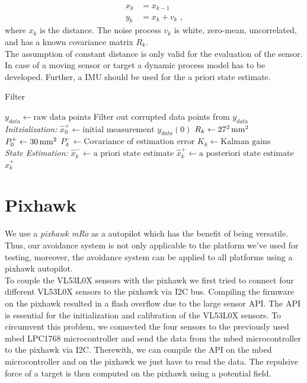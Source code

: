 \begin{equation}
\label{eq:filter}
\begin{split} 
x_k & = x_{k-1} \\
y_k & = x_k + v_k \text{ ,}
\end{split}
\end{equation}
where $x_k$ is the distance. The noise process $v_k$ is white, zero-mean, uncorrelated, and has a known covariance matrix  $R_k$.\\
The assumption of constant distance is only valid for the evaluation of the sensor. In case of a moving sensor or target a dynamic process model has to be developed. Further, a IMU should be used for the a priori state estimate.\\

\begin{algorithm}
	\caption{Filter}\label{alg:filter}
	\begin{algorithmic}[1]
		\State $y_{data}\gets \text{raw data points}$ 
		\State Filter out corrupted data points from $y_{data}$ \\
		\textit{Initzialization:}
		\State $\hat{x}^+_0\gets\text{initial measurement }y_{data}(0)$
		\State $R_k\gets\unit[27^2]{mm^2}$ 
		\State $P^+_0\gets \unit[30]{mm^2}$ 
		\For{ each $k = (0, \text{ number of data point]}$}	
		\State  $P^-_k \gets \text{Covariance of estimation error}$
		\State	$K_k \gets \text{Kalman gains}$
		\EndFor \\
		\textit{State Estimation:}	 
		\For{ each $k = (0, \text{ number of data point]}$}
		\State {} 
		\State $\hat{x}^-_k \gets \text{a priori state estimate}$
		\State $\hat{x}^+_k \gets \text{a posteriori state estimate}$
		\EndFor
		\State \Return $\hat{x}^+_k$
		\EndProcedure
		
	\end{algorithmic}
\end{algorithm}


\section{Pixhawk}
\label{sec:pixhawk}
We use a \textit{pixhawk mRo} as a autopilot which has the benefit of being versatile. Thus, our avoidance system is not only applicable to the platform we've used for testing, moreover, the avoidance system can be applied to all platforms using a pixhawk autopilot.\\
To couple the VL53L0X sensors with the pixhawk we first tried to connect four different VL53L0X sensors to the pixhawk via I2C bus. Compiling the firmware on the pixhawk resulted in a flash overflow due to the large sensor API. The API is essential for the initialization and calibration of the VL53L0X sensors. To circumvent this problem, we connected the four sensors to the previously used mbed LPC1768 microcontroller and send the data from the mbed microcontroller to the pixhawk via I2C. Therewith, we can compile the API on the mbed microcontroller and on the pixhawk we just have to read the data. The repulsive force of a target is then computed on the pixhawk using a potential field.



